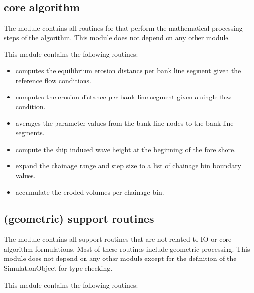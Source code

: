 \subsection{core algorithm }

The  module contains all routines for that perform the mathematical processing steps of the algorithm.
This module does not depend on any other \dfastbe module.

This module contains the following routines:

\begin{itemize}
\item {} computes the equilibrium erosion distance per bank line segment given the reference flow conditions.
\item {} computes the erosion distance per bank line segment given a single flow condition.
\item {} averages the parameter values from the bank line nodes to the bank line segments.
\item {} compute the ship induced wave height at the beginning of the fore shore.
\item {} expand the chainage range and step size to a list of chainage bin boundary values.
\item {} accumulate the eroded volumes per chainage bin.
\end{itemize}


\subsection{(geometric) support routines }

The  module contains all support routines that are not related to IO or core algorithm formulations.
Most of these routines include geometric processing.
This module does not depend on any other \dfastbe module except for the definition of the SimulationObject for type checking.

This module contains the following routines:

